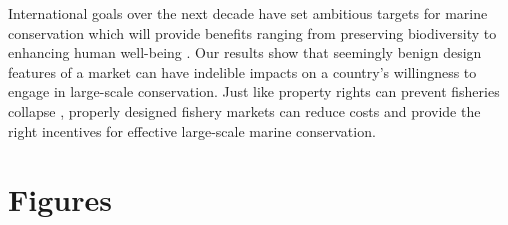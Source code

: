 \documentclass[12pt]{article}
\begin{document}
International goals over the next decade have set ambitious targets for marine conservation which will provide benefits ranging from preserving biodiversity to enhancing human well-being \cite{oleary_2016,roberts_2017,dinerstein_2019,ban_2019}. Our results show that seemingly benign design
features of a market can have indelible impacts on a country’s willingness to engage in large-scale conservation. Just like property rights can prevent fisheries collapse \cite{costello_2008}, properly designed fishery markets can reduce costs and provide the right incentives for effective large-scale marine conservation.





\clearpage

\FloatBarrier

\section*{Figures}
\end{document}
